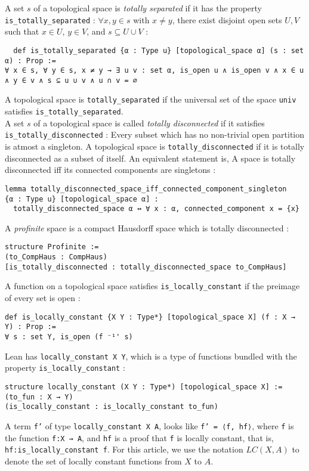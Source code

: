 \documentclass[11pt]{article}
\newcommand{\lean}[1]{\texttt{#1}\xspace} %
\begin{document}
A set $s$ of a topological space is \textit{totally separated} if it has the property \lean{is\_totally\_separated} : 
$\forall x, y \in s$ with $x \ne y$, there exist disjoint open sets $U, V$ such that $x \in U$, $y \in V$, and
$s \subseteq U \cup V$ : 
\begin{lstlisting}
  def is_totally_separated {α : Type u} [topological_space α] (s : set α) : Prop :=
∀ x ∈ s, ∀ y ∈ s, x ≠ y → ∃ u v : set α, is_open u ∧ is_open v ∧ x ∈ u ∧ y ∈ v ∧ s ⊆ u ∪ v ∧ u ∩ v = ∅
\end{lstlisting}
A topological space is \lean{totally\_separated} if the universal set of the space \lean{univ} 
satisfies \lean{is\_totally\_separated}. \\
A set $s$ of a topological space is called \textit{totally disconnected} if it satisfies \lean{is\_totally\_disconnected} : 
Every subset which has no non-trivial open partition is atmost a singleton. A topological space is \lean{totally\_disconnected} if it is
totally disconnected as a subset of itself. An equivalent statement is, A space is totally disconnected iff its connected components are singletons :
\begin{lstlisting}
lemma totally_disconnected_space_iff_connected_component_singleton 
{α : Type u} [topological_space α] :
  totally_disconnected_space α ↔ ∀ x : α, connected_component x = {x}
\end{lstlisting} 

A \textit{profinite} space is a compact Hausdorff space which is totally disconnected :
\begin{lstlisting}
structure Profinite :=
(to_CompHaus : CompHaus)
[is_totally_disconnected : totally_disconnected_space to_CompHaus]
\end{lstlisting}


A function on a topological space satisfies \lean{is\_locally\_constant} if the preimage of every set is open : 
\begin{lstlisting}
def is_locally_constant {X Y : Type*} [topological_space X] (f : X → Y) : Prop := 
∀ s : set Y, is_open (f ⁻¹' s)
\end{lstlisting} 

Lean has \lean{locally\_constant X Y}, which is a type of functions bundled with the property 
\newline \lean{is\_locally\_constant} :
\begin{lstlisting}
structure locally_constant (X Y : Type*) [topological_space X] :=
(to_fun : X → Y)
(is_locally_constant : is_locally_constant to_fun)
\end{lstlisting}
A term \lean{f'} of type \lean{locally\_constant X A}, looks like \lean{f' = ⟨f, hf⟩}, where 
\lean{f} is the function \lean{f:X → A}, and \lean{hf} is a proof that \lean{f} is locally constant, 
that is, \lean{hf:is\_locally\_constant f}. 
For this article, we use the notation $LC(X, A)$ to denote the set of locally constant functions 
from $X$ to $A$. \\
\end{document}
